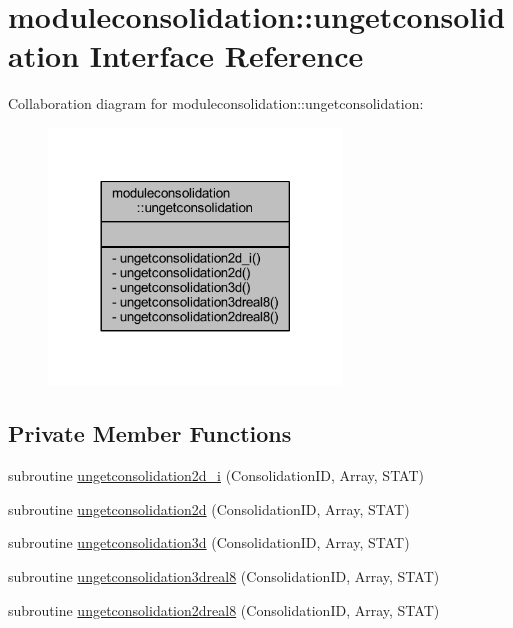 \hypertarget{interfacemoduleconsolidation_1_1ungetconsolidation}{}\section{moduleconsolidation\+:\+:ungetconsolidation Interface Reference}
\label{interfacemoduleconsolidation_1_1ungetconsolidation}


Collaboration diagram for moduleconsolidation\+:\+:ungetconsolidation\+:\nopagebreak
\begin{figure}[H]
\begin{center}
\leavevmode
\includegraphics[width=221pt]{interfacemoduleconsolidation_1_1ungetconsolidation__coll__graph}
\end{center}
\end{figure}
\subsection*{Private Member Functions}
\begin{DoxyCompactItemize}
\item 
subroutine \mbox{\hyperlink{interfacemoduleconsolidation_1_1ungetconsolidation_a4edefb4fe481185661560f21ae240dd0}{ungetconsolidation2d\+\_\+i}} (Consolidation\+ID, Array, S\+T\+AT)
\item 
subroutine \mbox{\hyperlink{interfacemoduleconsolidation_1_1ungetconsolidation_a33d9def64f09eab2c66338cff353fc12}{ungetconsolidation2d}} (Consolidation\+ID, Array, S\+T\+AT)
\item 
subroutine \mbox{\hyperlink{interfacemoduleconsolidation_1_1ungetconsolidation_a78f4acd934f586dc52b4c018996d4ad5}{ungetconsolidation3d}} (Consolidation\+ID, Array, S\+T\+AT)
\item 
subroutine \mbox{\hyperlink{interfacemoduleconsolidation_1_1ungetconsolidation_a300c416b5932aa76e437f0f9dbea7d88}{ungetconsolidation3dreal8}} (Consolidation\+ID, Array, S\+T\+AT)
\item 
subroutine \mbox{\hyperlink{interfacemoduleconsolidation_1_1ungetconsolidation_a65752b5117caf88d291d87a6dabd5d81}{ungetconsolidation2dreal8}} (Consolidation\+ID, Array, S\+T\+AT)
\end{DoxyCompactItemize}


